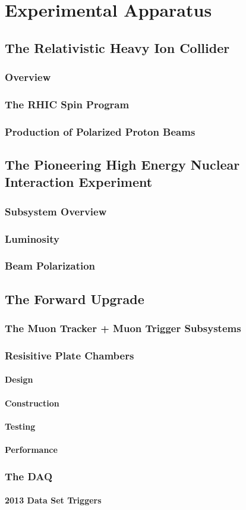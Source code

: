 \chapter{Experimental Apparatus}
\section{The Relativistic Heavy Ion Collider}
\subsection{Overview}
\subsection{The RHIC Spin Program}
\subsection{Production of Polarized Proton Beams}
\section{The Pioneering High Energy Nuclear Interaction Experiment}
\subsection{Subsystem Overview}
\subsection{Luminosity}
\subsection{Beam Polarization}
\section{The Forward Upgrade}
\subsection{The Muon Tracker + Muon Trigger Subsystems}
\subsection{Resisitive Plate Chambers}
\subsubsection{Design}
\subsubsection{Construction}
\subsubsection{Testing}
\subsubsection{Performance}
\subsection{The DAQ}
\subsubsection{2013 Data Set Triggers}
